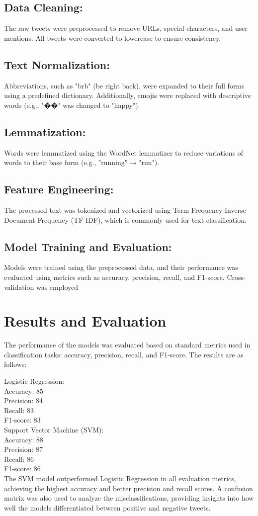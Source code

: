 \documentclass[conference]{IEEEtran}
\begin{document}
   \subsection{Data Cleaning:} 
    The raw tweets were preprocessed to remove URLs, special characters, and user mentions. All tweets were converted to lowercase to ensure consistency.

    \subsection{Text Normalization:}
    Abbreviations, such as "brb" (be right back), were expanded to their full forms using a predefined dictionary. Additionally, emojis were replaced with descriptive words (e.g., "��" was changed to "happy").

    \subsection{Lemmatization:}
    Words were lemmatized using the WordNet lemmatizer to reduce variations of words to their base form (e.g., "running" → "run").

    \subsection{Feature Engineering:}
    The processed text was tokenized and vectorized using Term Frequency-Inverse Document Frequency (TF-IDF), which is commonly used for text classification.

    \subsection{Model Training and Evaluation:}
    Models were trained using the preprocessed data, and their performance was evaluated using metrics such as accuracy, precision, recall, and F1-score. Cross-validation was employed
\section{Results and Evaluation}
The performance of the models was evaluated based on standard metrics used in classification tasks: accuracy, precision, recall, and F1-score. 
The results are as follows:

    Logistic Regression:
\\
        Accuracy: 85%
\\
        Precision: 84%
\\
        Recall: 83%
\\
        F1-score: 83%
\\
    Support Vector Machine (SVM):
\\
        Accuracy: 88%
\\
        Precision: 87%
\\
        Recall: 86%
\\
        F1-score: 86%
\\
The SVM model outperformed Logistic Regression in all evaluation metrics, achieving the highest accuracy and better precision and recall scores. 
A confusion matrix was also used to analyze the misclassifications, providing insights into how well the models differentiated between positive
 and negative tweets.
\end{document}
